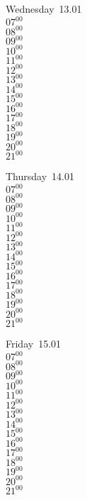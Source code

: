 \documentclass[11pt,a4paper]{book}\usepackage[]{graphicx}\usepackage[]{color}
\begin{document}
\begin{weekdaybox}
  Wednesday~13.01\\
  { 
  \vfill
  $07^{00}$\\
$08^{00}$\\
$09^{00}$\\
$10^{00}$\\
$11^{00}$\\
$12^{00}$\\
$13^{00}$\\
$14^{00}$\\
$15^{00}$\\
$16^{00}$\\
$17^{00}$\\
$18^{00}$\\
$19^{00}$\\
$20^{00}$\\
$21^{00}$\\
  }
\end{weekdaybox}
\clearpage
\begin{headerbox}
\end{headerbox}
\begin{weekdaybox}
  Thursday~14.01\\
  { 
  \vfill
  $07^{00}$\\
$08^{00}$\\
$09^{00}$\\
$10^{00}$\\
$11^{00}$\\
$12^{00}$\\
$13^{00}$\\
$14^{00}$\\
$15^{00}$\\
$16^{00}$\\
$17^{00}$\\
$18^{00}$\\
$19^{00}$\\
$20^{00}$\\
$21^{00}$\\
  }
\end{weekdaybox} 
\begin{weekdaybox}
  Friday~15.01\\
  { 
  \vfill
  $07^{00}$\\
$08^{00}$\\
$09^{00}$\\
$10^{00}$\\
$11^{00}$\\
$12^{00}$\\
$13^{00}$\\
$14^{00}$\\
$15^{00}$\\
$16^{00}$\\
$17^{00}$\\
$18^{00}$\\
$19^{00}$\\
$20^{00}$\\
$21^{00}$\\
  }
\end{weekdaybox}
\end{document}
